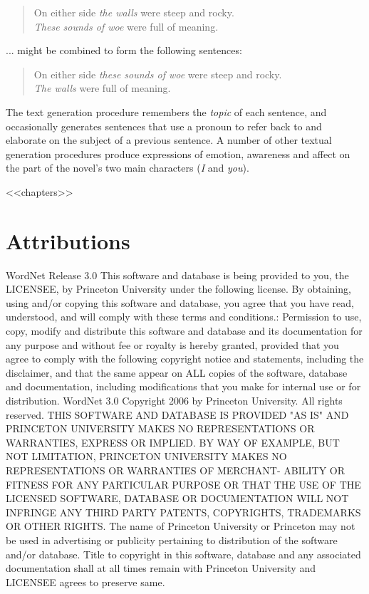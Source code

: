 \documentclass[12pt,openany]{book}
\begin{document}
\begin{quote}
On either side \textit{the walls} were steep and rocky.\\
\textit{These sounds of woe} were full of meaning.
\end{quote}

... might be combined to form the following sentences:

\begin{quote}
On either side \textit{these sounds of woe} were steep and rocky.\\
\textit{The walls} were full of meaning.
\end{quote}

The text generation procedure remembers the \textit{topic} of each sentence,
and occasionally generates sentences that use a pronoun to refer back to and
elaborate on the subject of a previous sentence. A number of other textual
generation procedures produce expressions of emotion, awareness and affect on
the part of the novel's two main characters (\textit{I} and \textit{you}).

\mainmatter

<<chapters>>

\backmatter

\chapter{Attributions}

WordNet Release 3.0 This software and database is being provided to you, the
LICENSEE, by Princeton University under the following license. By obtaining,
using and/or copying this software and database, you agree that you have read,
understood, and will comply with these terms and conditions.: Permission to
use, copy, modify and distribute this software and database and its
documentation for any purpose and without fee or royalty is hereby granted,
provided that you agree to comply with the following copyright notice and
statements, including the disclaimer, and that the same appear on ALL copies of
the software, database and documentation, including modifications that you make
for internal use or for distribution. WordNet 3.0 Copyright 2006 by Princeton
University. All rights reserved. THIS SOFTWARE AND DATABASE IS PROVIDED "AS IS"
AND PRINCETON UNIVERSITY MAKES NO REPRESENTATIONS OR WARRANTIES, EXPRESS OR
IMPLIED. BY WAY OF EXAMPLE, BUT NOT LIMITATION, PRINCETON UNIVERSITY MAKES NO
REPRESENTATIONS OR WARRANTIES OF MERCHANT- ABILITY OR FITNESS FOR ANY
PARTICULAR PURPOSE OR THAT THE USE OF THE LICENSED SOFTWARE, DATABASE OR
DOCUMENTATION WILL NOT INFRINGE ANY THIRD PARTY PATENTS, COPYRIGHTS, TRADEMARKS
OR OTHER RIGHTS. The name of Princeton University or Princeton may not be used
in advertising or publicity pertaining to distribution of the software and/or
database. Title to copyright in this software, database and any associated
documentation shall at all times remain with Princeton University and LICENSEE
agrees to preserve same.
\end{document}
